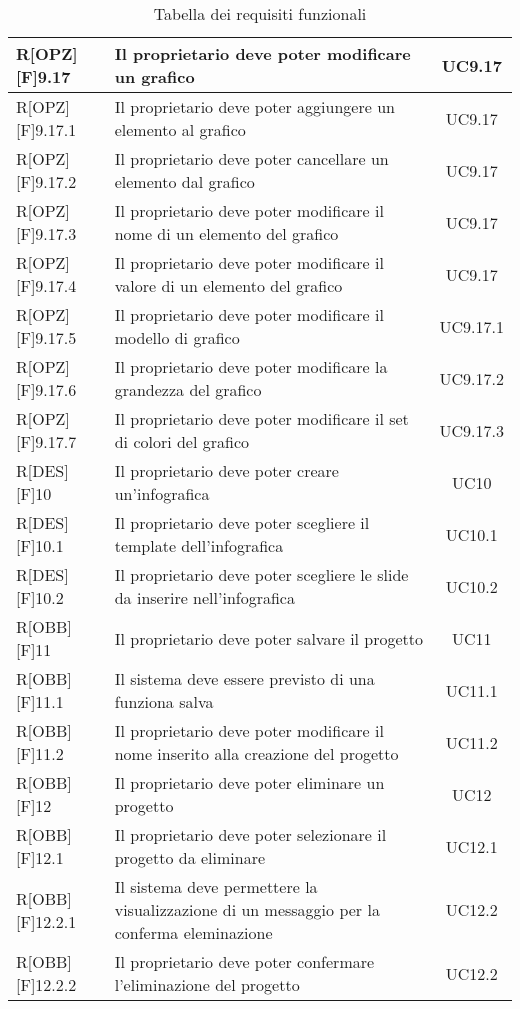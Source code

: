 \begin{center}
\begin{table}[h]
\begin{tabular}{|l|p{}|c|}
		R[OPZ][F]9.17 & Il proprietario deve poter modificare un grafico & UC9.17 \\ \midrule
		R[OPZ][F]9.17.1 & Il proprietario deve poter aggiungere un elemento al grafico & UC9.17 \\ \midrule
		R[OPZ][F]9.17.2 & Il proprietario deve poter cancellare un elemento dal grafico & UC9.17 \\ \midrule
		R[OPZ][F]9.17.3 & Il proprietario deve poter modificare il nome di un elemento del grafico & UC9.17 \\ \midrule
		R[OPZ][F]9.17.4 & Il proprietario deve poter modificare il valore di un elemento del grafico & UC9.17 \\ \midrule
		R[OPZ][F]9.17.5 & Il proprietario deve poter modificare il modello di grafico & UC9.17.1 \\ \midrule
		R[OPZ][F]9.17.6 & Il proprietario deve poter modificare la grandezza del grafico & UC9.17.2 \\ \midrule
		R[OPZ][F]9.17.7 & Il proprietario deve poter modificare il set di colori del grafico & UC9.17.3 \\ \midrule
		
		R[DES][F]10 & Il proprietario deve poter creare un'infografica & UC10 \\ \midrule
		R[DES][F]10.1 & Il proprietario deve poter scegliere il template dell'infografica & UC10.1 \\ \midrule
		R[DES][F]10.2 & Il proprietario deve poter scegliere le slide da inserire nell'infografica & UC10.2 \\ \midrule
		
		R[OBB][F]11 & Il proprietario deve poter salvare il progetto & UC11 \\ \midrule
		R[OBB][F]11.1 & Il sistema deve essere previsto di una funziona salva & UC11.1 \\ \midrule
		R[OBB][F]11.2 & Il proprietario deve poter modificare il nome inserito alla creazione del progetto & UC11.2 \\ \midrule
		
		R[OBB][F]12 & Il proprietario deve poter eliminare un progetto & UC12 \\ \midrule
		R[OBB][F]12.1 & Il proprietario deve poter selezionare il progetto da eliminare & UC12.1 \\ \midrule
		R[OBB][F]12.2.1 & Il sistema deve permettere la visualizzazione di un messaggio per la conferma eleminazione & UC12.2 \\ \midrule
		R[OBB][F]12.2.2 & Il proprietario deve poter confermare l'eliminazione del progetto  & UC12.2 \\

		\end{tabular}
		
	\caption{Tabella dei requisiti funzionali}
	\end{table}


\end{center}
	